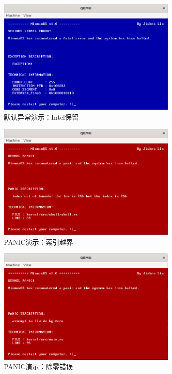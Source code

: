 \begin{figure}[htbp]
    \centering
    \includegraphics[width=0.8\textwidth]{figures/ExceptionHandlerPresentation.png}
    \caption{默认异常演示：Intel保留}
\end{figure}

\begin{figure}[htbp]
    \centering
    \includegraphics[width=0.8\textwidth]{figures/PanicHandlerPresentation.png}
    \caption{PANIC演示：索引越界}
\end{figure}

\begin{figure}[htbp]
    \centering
    \includegraphics[width=0.8\textwidth]{figures/DivisionErrorPanicPresentation.png}
    \caption{PANIC演示：除零错误}
\end{figure}

